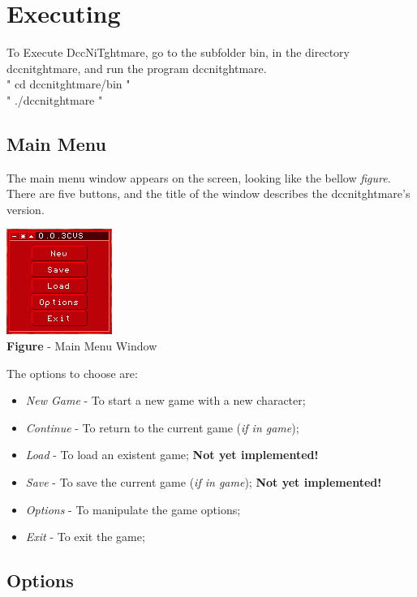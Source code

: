 \documentclass[ letterpaper,12pt]{article}
\begin{document}
\section{Executing}

To Execute DccNiTghtmare, go to the subfolder bin, in the directory dccnitghtmare, and run the program dccnitghtmare.\\
" cd dccnitghtmare/bin "\\
" ./dccnitghtmare "

\subsection{Main Menu}

The main menu window appears on the screen, looking like the bellow {\it figure}. There are five buttons, and the title of the window describes the dccnitghtmare's version.

\begin{center}
  \includegraphics{mainMenuWindow.png}
\\{\bf Figure} - Main Menu Window
\end{center}

The options to choose are:

\begin{itemize}
\item{{\it New Game} - To start a new game with a new character;}
\item{{\it Continue} - To return to the current game ({\it if in game});}
\item{{\it Load} - To load an existent game; {\bf Not yet implemented!}}
\item{{\it Save} - To save the current game ({\it if in game}); {\bf Not yet implemented!}}
\item{{\it Options} - To manipulate the game options;}
\item{{\it Exit} - To exit the game;}
\end{itemize}

\subsection{Options}
\end{document}
